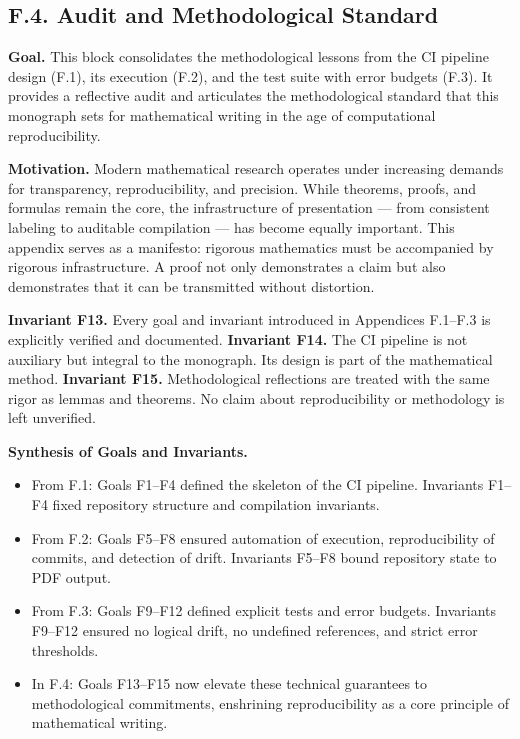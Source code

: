 \subsection*{F.4. Audit and Methodological Standard}

\noindent \textbf{Goal.} This block consolidates the methodological lessons from the CI pipeline design (F.1), its execution (F.2), and the test suite with error budgets (F.3). It provides a reflective audit and articulates the methodological standard that this monograph sets for mathematical writing in the age of computational reproducibility.

\medskip
\noindent \textbf{Motivation.} Modern mathematical research operates under increasing demands for transparency, reproducibility, and precision. While theorems, proofs, and formulas remain the core, the infrastructure of presentation — from consistent labeling to auditable compilation — has become equally important. This appendix serves as a manifesto: rigorous mathematics must be accompanied by rigorous infrastructure. A proof not only demonstrates a claim but also demonstrates that it can be transmitted without distortion.

\medskip
\noindent \textbf{Invariant F13.} Every goal and invariant introduced in Appendices F.1–F.3 is explicitly verified and documented.  
\textbf{Invariant F14.} The CI pipeline is not auxiliary but integral to the monograph. Its design is part of the mathematical method.  
\textbf{Invariant F15.} Methodological reflections are treated with the same rigor as lemmas and theorems. No claim about reproducibility or methodology is left unverified.  

\medskip
\noindent \textbf{Synthesis of Goals and Invariants.}

\begin{itemize}
  \item From F.1: Goals F1–F4 defined the skeleton of the CI pipeline. Invariants F1–F4 fixed repository structure and compilation invariants.  
  \item From F.2: Goals F5–F8 ensured automation of execution, reproducibility of commits, and detection of drift. Invariants F5–F8 bound repository state to PDF output.  
  \item From F.3: Goals F9–F12 defined explicit tests and error budgets. Invariants F9–F12 ensured no logical drift, no undefined references, and strict error thresholds.  
  \item In F.4: Goals F13–F15 now elevate these technical guarantees to methodological commitments, enshrining reproducibility as a core principle of mathematical writing.  
\end{itemize}

